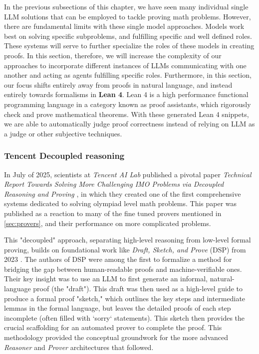\documentclass[12pt, letterpaper]{article}
\begin{document}
In the previous subsections of this chapter, we have seen many individual single LLM solutions that can be employed to tackle proving math problems. However, there are fundamental limits with these single model approaches. Models work best on solving specific subproblems, and fulfilling specific and well defined roles. These systems will serve to further specialize the roles of these models in creating proofs. In this section, therefore, we will increase the complexity of our approaches to incorporate different instances of LLMs communicating with one another and acting as agents fulfilling specific roles. Furthermore, in this section, our focus shifts entirely away from proofs in natural language, and instead entirely towards formalisms in \textbf{Lean 4}. Lean 4 is a high performance functional programming language in a category known as proof assistants, which rigorously check and prove mathematical theorems. With these generated Lean 4 snippets, we are able to automatically judge proof correctness instead of relying on LLM as a judge or other subjective techniques.

\subsubsection{Tencent Decoupled reasoning}

In July of 2025, scientists at \textit{Tencent AI Lab} published a pivotal paper \textit{Technical Report
Towards Solving More Challenging IMO Problems via Decoupled
Reasoning and Proving} \cite{zhou2025solvingformalmathproblems}, in which they created one of the first comprehensive systems dedicated to solving olympiad level math problems. This paper was published as a reaction to many of the fine tuned provers mentioned in \autoref{sec:provers}, and their performance on more complicated problems. 

This "decoupled" approach, separating high-level reasoning from low-level formal proving, builds on foundational work like \textit{Draft, Sketch, and Prove} (DSP) from 2023 \citep{jiang2023draftsketchproveguiding}. The authors of DSP were among the first to formalize a method for bridging the gap between human-readable proofs and machine-verifiable ones. Their key insight was to use an LLM to first generate an informal, natural-language proof (the "draft"). This draft was then used as a high-level guide to produce a formal proof "sketch," which outlines the key steps and intermediate lemmas in the formal language, but leaves the detailed proofs of each step incomplete (often filled with `sorry` statements). This sketch then provides the crucial scaffolding for an automated prover to complete the proof. This methodology provided the conceptual groundwork for the more advanced \textit{Reasoner} and \textit{Prover} architectures that followed.
\end{document}
